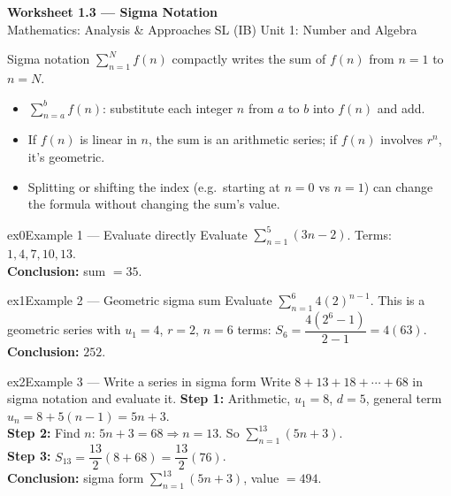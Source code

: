 \documentclass[11pt]{article}
\begin{document}
\begin{center}
{\LARGE\bfseries\color{titleblue}Worksheet 1.3 --- Sigma Notation}\\[2pt]
{\small Mathematics: Analysis \& Approaches SL (IB) \textperiodcentered{} Unit 1: Number and Algebra}
\end{center}

\begin{ideabox}
Sigma notation $\displaystyle\sum_{n=1}^{N}f(n)$ compactly writes the sum of $f(n)$ from $n=1$ to $n=N$.
\begin{itemize}[leftmargin=*,itemsep=2pt]
  \item $\displaystyle\sum_{n=a}^{b}f(n)$: substitute each integer $n$ from $a$ to $b$ into $f(n)$ and add.
  \item If $f(n)$ is linear in $n$, the sum is an arithmetic series; if $f(n)$ involves $r^n$, it's geometric.
  \item Splitting or shifting the index (e.g.\ starting at $n=0$ vs $n=1$) can change the formula without changing the sum's value.
\end{itemize}
\end{ideabox}


\begin{example}{ex0}{Example 1 --- Evaluate directly}
Evaluate $\displaystyle\sum_{n=1}^{5}(3n-2)$.\soln
Terms: $1,4,7,10,13$.\\[3pt]\textbf{Conclusion:} sum $=35$.
\end{example}

\begin{example}{ex1}{Example 2 --- Geometric sigma sum}
Evaluate $\displaystyle\sum_{n=1}^{6}4(2)^{n-1}$.\soln
This is a geometric series with $u_1=4$, $r=2$, $n=6$ terms: $S_6=\dfrac{4(2^6-1)}{2-1}=4(63)$.\\[3pt]\textbf{Conclusion:} $252$.
\end{example}

\begin{example}{ex2}{Example 3 --- Write a series in sigma form}
Write $8+13+18+\cdots+68$ in sigma notation and evaluate it.\soln
\textbf{Step 1:} Arithmetic, $u_1=8$, $d=5$, general term $u_n=8+5(n-1)=5n+3$.\\[3pt]
\textbf{Step 2:} Find $n$: $5n+3=68\Rightarrow n=13$. So $\displaystyle\sum_{n=1}^{13}(5n+3)$.\\[3pt]
\textbf{Step 3:} $S_{13}=\dfrac{13}{2}(8+68)=\dfrac{13}{2}(76)$.\\[3pt]\textbf{Conclusion:} sigma form $\sum_{n=1}^{13}(5n+3)$, value $=494$.
\end{example}
\end{document}
